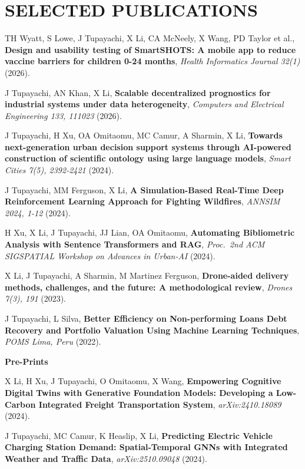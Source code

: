 \documentclass[10pt, letterpaper]{article}
\begin{document}
\section{SELECTED PUBLICATIONS}
\small

\noindent TH Wyatt, S Lowe, J Tupayachi, X Li, CA McNeely, X Wang, PD Taylor et al., \textbf{Design and usability testing of SmartSHOTS: A mobile app to reduce vaccine barriers for children 0-24 months}, \textit{Health Informatics Journal 32(1)} (2026).

\noindent J Tupayachi, AN Khan, X Li, \textbf{Scalable decentralized prognostics for industrial systems under data heterogeneity}, \textit{Computers and Electrical Engineering 133, 111023} (2026).

\noindent J Tupayachi, H Xu, OA Omitaomu, MC Camur, A Sharmin, X Li, \textbf{Towards next-generation urban decision support systems through AI-powered construction of scientific ontology using large language models}, \textit{Smart Cities 7(5), 2392-2421} (2024).

\noindent J Tupayachi, MM Ferguson, X Li, \textbf{A Simulation-Based Real-Time Deep Reinforcement Learning Approach for Fighting Wildfires}, \textit{ANNSIM 2024, 1-12} (2024).

\noindent H Xu, X Li, J Tupayachi, JJ Lian, OA Omitaomu, \textbf{Automating Bibliometric Analysis with Sentence Transformers and RAG}, \textit{Proc.\ 2nd ACM SIGSPATIAL Workshop on Advances in Urban-AI} (2024).

\noindent X Li, J Tupayachi, A Sharmin, M Martinez Ferguson, \textbf{Drone-aided delivery methods, challenges, and the future: A methodological review}, \textit{Drones 7(3), 191} (2023).

\noindent J Tupayachi, L Silva, \textbf{Better Efficiency on Non-performing Loans Debt Recovery and Portfolio Valuation Using Machine Learning Techniques}, \textit{POMS Lima, Peru} (2022).


\vspace{0.2cm}
\noindent\textbf{Pre-Prints}

\noindent X Li, H Xu, J Tupayachi, O Omitaomu, X Wang, \textbf{Empowering Cognitive Digital Twins with Generative Foundation Models: Developing a Low-Carbon Integrated Freight Transportation System}, \textit{arXiv:2410.18089} (2024).

\noindent J Tupayachi, MC Camur, K Heaslip, X Li, \textbf{Predicting Electric Vehicle Charging Station Demand: Spatial-Temporal GNNs with Integrated Weather and Traffic Data}, \textit{arXiv:2510.09048} (2024).
\end{document}
